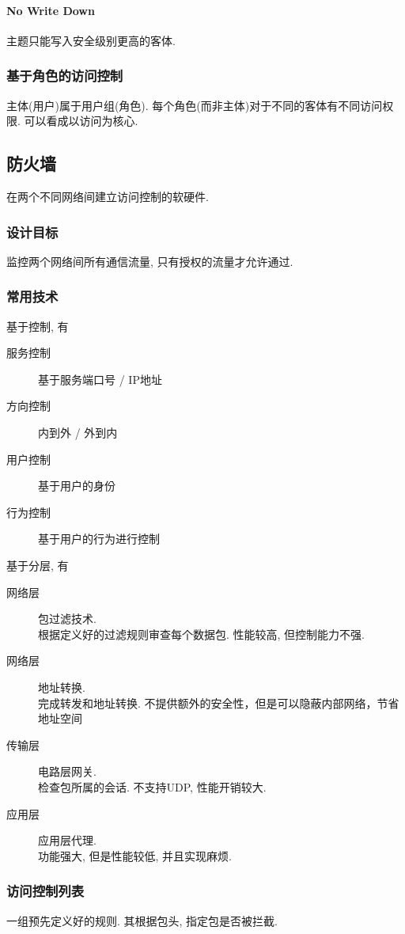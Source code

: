 \documentclass{ctexart}
\begin{document}
\paragraph{No Write Down} 主题只能写入安全级别更高的客体.
\subsubsection{基于角色的访问控制} 主体(用户)属于用户组(角色). 每个角色(而非主体)对于不同的客体有不同访问权限. 
    可以看成以访问为核心.

\subsection{防火墙} 在两个不同网络间建立访问控制的软硬件.
\subsubsection{设计目标} 监控两个网络间所有通信流量, 只有授权的流量才允许通过.
\subsubsection{常用技术} 基于控制, 有\begin{description}
        \item[服务控制] 基于服务端口号 / IP地址
        \item[方向控制] 内到外 / 外到内
        \item[用户控制] 基于用户的身份
        \item[行为控制] 基于用户的行为进行控制
    \end{description}基于分层, 有\begin{description}
        \item[网络层] 包过滤技术.\\ 根据定义好的过滤规则审查每个数据包. 性能较高, 但控制能力不强.
        \item[网络层] 地址转换.\\ 完成转发和地址转换. 不提供额外的安全性，但是可以隐蔽内部网络，节省地址空间
        \item[传输层] 电路层网关.\\ 检查包所属的会话. 不支持UDP, 性能开销较大.
        \item[应用层] 应用层代理.\\ 功能强大, 但是性能较低, 并且实现麻烦.
    \end{description}
\subsubsection{访问控制列表} 一组预先定义好的规则. 其根据包头, 指定包是否被拦截.
\end{document}
